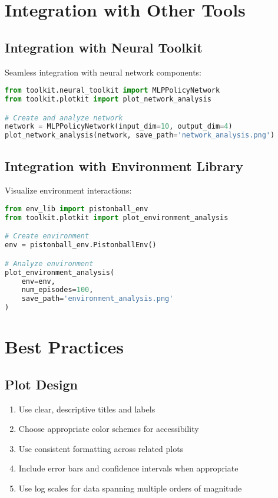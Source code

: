 \section{Integration with Other Tools}

\subsection{Integration with Neural Toolkit}

Seamless integration with neural network components:

\begin{lstlisting}[language=python, caption=Neural Toolkit Integration]
from toolkit.neural_toolkit import MLPPolicyNetwork
from toolkit.plotkit import plot_network_analysis

# Create and analyze network
network = MLPPolicyNetwork(input_dim=10, output_dim=4)
plot_network_analysis(network, save_path='network_analysis.png')
\end{lstlisting}

\subsection{Integration with Environment Library}

Visualize environment interactions:

\begin{lstlisting}[language=python, caption=Environment Integration]
from env_lib import pistonball_env
from toolkit.plotkit import plot_environment_analysis

# Create environment
env = pistonball_env.PistonballEnv()

# Analyze environment
plot_environment_analysis(
    env=env,
    num_episodes=100,
    save_path='environment_analysis.png'
)
\end{lstlisting}

\section{Best Practices}

\subsection{Plot Design}

\begin{enumerate}
    \item Use clear, descriptive titles and labels
    \item Choose appropriate color schemes for accessibility
    \item Use consistent formatting across related plots
    \item Include error bars and confidence intervals when appropriate
    \item Use log scales for data spanning multiple orders of magnitude
\end{enumerate}

